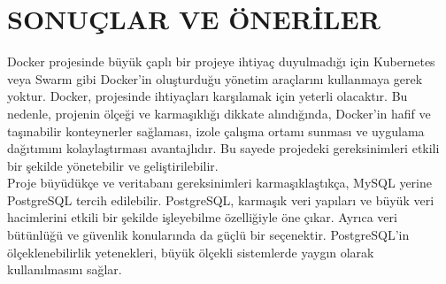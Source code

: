\section{SONUÇLAR VE ÖNERİLER}
Docker projesinde büyük çaplı bir projeye ihtiyaç duyulmadığı için Kubernetes veya Swarm gibi Docker'in oluşturduğu yönetim araçlarını kullanmaya gerek yoktur. Docker, projesinde ihtiyaçları karşılamak için yeterli olacaktır. Bu nedenle, projenin ölçeği ve karmaşıklığı dikkate alındığında, Docker'in hafif ve taşınabilir konteynerler sağlaması, izole çalışma ortamı sunması ve uygulama dağıtımını kolaylaştırması avantajlıdır. Bu sayede projedeki gereksinimleri etkili bir şekilde yönetebilir ve geliştirilebilir.\\

Proje büyüdükçe ve veritabanı gereksinimleri karmaşıklaştıkça, MySQL yerine PostgreSQL tercih edilebilir. PostgreSQL, karmaşık veri yapıları ve büyük veri hacimlerini etkili bir şekilde işleyebilme özelliğiyle öne çıkar. Ayrıca veri bütünlüğü ve güvenlik konularında da güçlü bir seçenektir. PostgreSQL'in ölçeklenebilirlik yetenekleri, büyük ölçekli sistemlerde yaygın olarak kullanılmasını sağlar.

